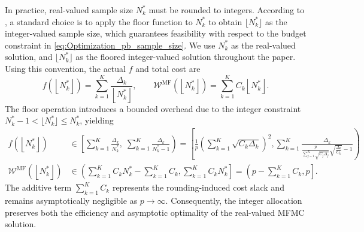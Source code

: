 In practice, real-valued sample size $N_k^*$ must be rounded to integers. According to \cite{PeWiGu:2016}, a standard choice is to apply the floor function to $N_k^*$ to obtain $\lfloor N_k^*\rfloor$ as the integer-valued sample size, which guarantees feasibility with respect to the budget constraint in \eqref{eq:Optimization_pb_sample_size}. We use $N_k^*$ as the real-valued solution, and $\lfloor N_k^* \rfloor$ as the floored integer-valued solution throughout the paper. Using this convention, the actual $f$ and total cost are
\[
f\left(\left\lfloor N_k^* \right\rfloor\right) = \sum_{k=1}^K\frac{\Delta_{k}}{\left\lfloor N_k^* \right\rfloor}, \qquad \mathcal{W}^{\text{MF}}\left(\left\lfloor N_k^* \right\rfloor\right) = \sum_{k=1}^K C_k\left\lfloor N_k^* \right\rfloor.
\]
The floor operation introduces a bounded overhead due to the integer constraint 
$N_k^*-1 < \lfloor N_k^*\rfloor \le N_k^*$, yielding
%
\begin{equation}\label{eq:bounds_for_floor}
\begin{aligned}
    f\left(\left\lfloor N_k^* \right\rfloor\right)&\in \left[\sum_{k=1}^K\frac{\Delta_{k}}{N_k^*},\; \sum_{k=1}^K\frac{\Delta_{k}}{N_k^*-1}\right) = \left[\frac{1}{p}\left(\sum_{k=1}^K \sqrt{C_k\Delta_k}\right)^2, \sum_{k=1}^K\frac{\Delta_{k}}{\frac{p}{\sum_{j=1}^K \sqrt{C_j\Delta_j}}\sqrt{\frac{\Delta_k}{C_k}}-1}\right)\\
    \mathcal{W}^{\text{MF}}\left(\left\lfloor N_k^* \right\rfloor\right) &\in \left(\sum_{k=1}^KC_kN_k^*-\sum_{k=1}^K C_k, \sum_{k=1}^KC_kN_k^*\right]=\left( p-\sum_{k=1}^K C_k,p\right].
\end{aligned}
\end{equation}
%
The additive term $\sum_{k=1}^K C_k$ represents the rounding-induced cost slack and remains asymptotically negligible as $p\to\infty$. Consequently, the integer allocation preserves both the efficiency and asymptotic optimality of the real-valued MFMC solution. 

